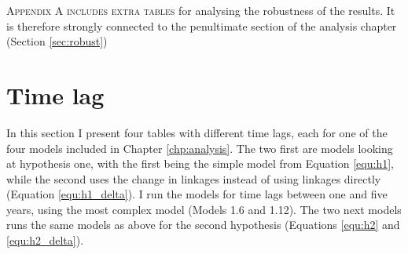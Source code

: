\lettrine{A}{ppendix A includes extra tables} for analysing the robustness of the results. It is therefore strongly connected to the penultimate section of the analysis chapter (Section \ref{sec:robust})

\section{Time lag}
In this section I present four tables with different time lags, each for one of the four models included in Chapter \ref{chp:analysis}. The two first are models looking at hypothesis one, with the first being the simple model from Equation \ref{equ:h1}, while the second uses the change in linkages instead of using linkages directly (Equation \ref{equ:h1_delta}). I run the models for time lags between one and five years, using the most complex model (Models 1.6 and 1.12). The two next models runs the same models as above for the second hypothesis (Equations \ref{equ:h2} and \ref{equ:h2_delta}). 

